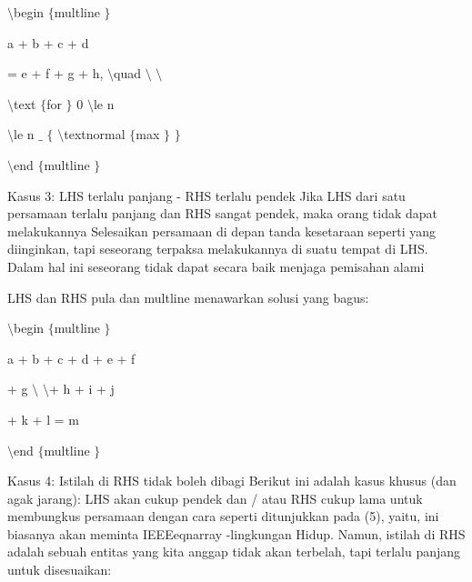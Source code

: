 \begin{itemize}
\vspace{12pt}
\noindent 
 $  \setminus  $begin $  \{  $multline $  \}  $ \par
\noindent 
a + b + c + d \par
\vspace{12pt}
\noindent 
= e + f + g + h,  $  \setminus  $quad  $  \setminus  $ $  \setminus  $ \par
\vspace{12pt}
\noindent 
 $  \setminus  $text $  \{  $for  $  \}  $ 0  $  \setminus  $le n \par
\vspace{12pt}
\noindent 
 $  \setminus  $le n $  \_  $ $  \{  $ $  \setminus  $textnormal $  \{  $max $  \}  $ $  \}  $ \par
\vspace{12pt}
\noindent 
 $  \setminus  $end $  \{  $multline $  \}  $ \par
\vspace{12pt}
\vspace{16pt}
\noindent 
Kasus 3: LHS terlalu panjang - RHS terlalu pendek Jika LHS dari satu persamaan terlalu panjang dan RHS sangat pendek, maka orang tidak dapat melakukannya Selesaikan persamaan di depan tanda kesetaraan seperti yang diinginkan, tapi seseorang terpaksa melakukannya di suatu tempat di LHS. Dalam hal ini seseorang tidak dapat secara baik menjaga pemisahan alami \par
\noindent 
LHS dan RHS pula dan multline menawarkan solusi yang bagus: \par
\vspace{12pt}
\vspace{12pt}
\noindent 
 $  \setminus  $begin $  \{  $multline $  \}  $ \par
\vspace{12pt}
\noindent 
a + b + c + d + e + f \par
\vspace{12pt}
\noindent 
+ g  $  \setminus  $ $  \setminus  $+ h + i + j \par
\vspace{12pt}
\noindent 
+ k + l = m \par
\vspace{12pt}
\noindent 
 $  \setminus  $end $  \{  $multline $  \}  $ \par
\vspace{12pt}
\noindent 
Kasus 4: Istilah di RHS tidak boleh dibagi Berikut ini adalah kasus khusus (dan agak jarang): LHS akan cukup pendek dan / atau RHS cukup lama untuk membungkus persamaan dengan cara seperti ditunjukkan pada (5), yaitu, ini biasanya akan meminta IEEEeqnarray -lingkungan Hidup. Namun, istilah di RHS adalah sebuah entitas yang kita anggap tidak akan terbelah, tapi terlalu panjang untuk disesuaikan: \par

\end{itemize}
